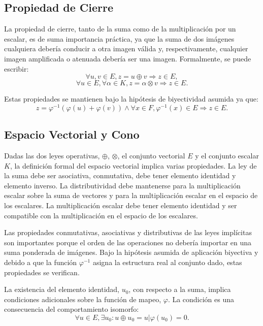 \subsection{Propiedad de Cierre}

La propiedad de cierre, tanto de la suma como de la multiplicación por un escalar, es de suma importancia práctica, ya que la suma de dos imágenes cualquiera debería conducir a otra imagen válida y, respectivamente, cualquier imagen amplificada o atenuada debería ser una imagen. Formalmente, se puede escribir:
\begin{equation}
	\forall u,v \in E, z = u \oplus v \Rightarrow z \in E,
\end{equation}
\begin{equation}
	\forall u \in E, \forall \alpha \in K, z=\alpha \otimes v \Rightarrow z \in E.
\end{equation}

Estas propiedades se mantienen bajo la hipótesis de biyectividad asumida ya que: 
\begin{equation}
	z=\varphi^{-1}(\varphi(u)+\varphi(v)) \land \forall x \in F, \varphi^{-1}(x) \in E \Rightarrow z \in E.
\end{equation}

\subsection{Espacio Vectorial y Cono}
Dadas las dos leyes operativas, $\oplus$, $\otimes$, el conjunto vectorial $E$ y el conjunto escalar $K$, la definición formal del espacio vectorial implica varias propiedades. La ley de la suma debe ser asociativa, conmutativa, debe tener elemento identidad y elemento inverso. La distributividad debe mantenerse para la multiplicación escalar sobre la suma de vectores y para la multiplicación escalar en el espacio de los escalares. La multiplicación escalar debe tener elemento identidad y ser compatible con la multiplicación en el espacio de los escalares.

Las propiedades conmutativas, asociativas y distributivas de las leyes implícitas son importantes porque el orden de las operaciones no debería importar en una suma ponderada de imágenes. Bajo la hipótesis asumida de aplicación biyectiva y debido a que la función $\varphi^{-1}$ asigna la estructura real al conjunto dado, estas propiedades se verifican.

La existencia del elemento identidad, $u_0$, con respecto a la suma, implica condiciones adicionales sobre la función de mapeo, $\varphi$. La condición es una consecuencia del comportamiento isomorfo:
\begin{equation}
	\forall u\in E, \exists u_0 : u \oplus u_0 = u | \varphi(u_0)=0.
\end{equation}

